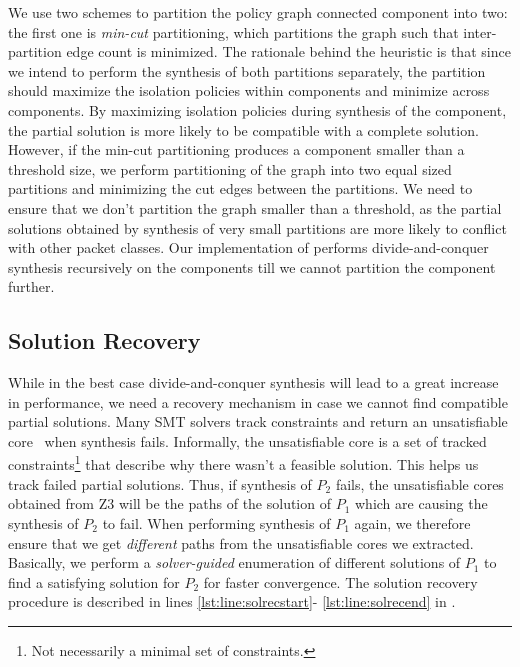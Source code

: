 We use two schemes to partition the policy graph connected component into two: the
first one is \emph{min-cut} partitioning, which partitions the graph
such that inter-partition edge count is minimized. The
rationale behind the heuristic is that since we intend to perform the
synthesis of both partitions separately, the partition should maximize
the isolation policies within components and minimize across
components. By maximizing isolation policies during synthesis of the
component, the partial solution is more likely to be compatible with a
complete solution. However, if the min-cut partitioning produces a
component smaller than a threshold size, we perform partitioning of
the graph into two equal sized partitions and minimizing the cut edges
between the partitions. We need to ensure that we don't partition the
graph smaller than a threshold, as the partial solutions obtained by
synthesis of very small partitions are more likely to conflict with
other packet classes. Our implementation of \Name performs
divide-and-conquer synthesis recursively on the components till we cannot partition the
component further. 

\subsection{Solution Recovery} \label{sec:recovery}
While in the best case divide-and-conquer synthesis  will lead to a great
increase in performance, we need a recovery mechanism in case we cannot find
compatible partial solutions. Many SMT solvers track constraints and return
an unsatisfiable core~\cite{unsatcores} when synthesis fails. Informally,
the unsatisfiable
core is a set of tracked constraints\footnote{
	Not necessarily a minimal set of constraints.}
 that describe why there wasn't a feasible 
solution. This helps us track failed partial solutions. 
Thus, if synthesis of $P_2$ fails, the unsatisfiable cores
obtained from Z3 will be the paths of the solution of $P_1$ which are
causing the synthesis of $P_2$ to fail. 
When performing synthesis of $P_1$
again, we therefore ensure that we get \emph{different} paths from the
unsatisfiable cores we extracted.  Basically, we perform a 
\emph{solver-guided} enumeration of different solutions of $P_1$ to
find a satisfying solution for $P_2$ for faster convergence. 
The solution recovery procedure is described in lines \ref{lst:line:solrecstart}-
\ref{lst:line:solrecend} in .

